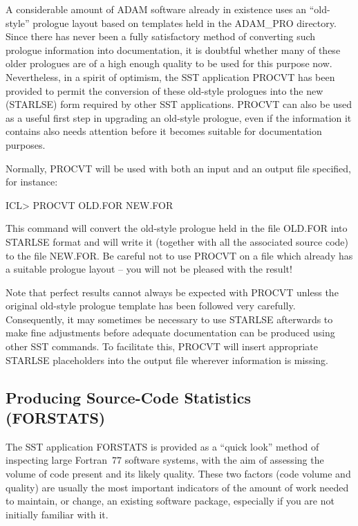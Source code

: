 \documentclass[twoside,11pt,nolof]{starlink}
\begin{document}
A considerable amount of ADAM software already in existence uses an
``old-style'' prologue layout based on templates held in the ADAM\_PRO
directory.
Since there has never been a fully satisfactory method of converting such
prologue information into documentation, it is doubtful whether many of
these older prologues are of a high enough quality to be used for this
purpose now.
Nevertheless, in a spirit of optimism, the SST application PROCVT has been
provided to permit the conversion of these old-style prologues into the new
(STARLSE) form required by other SST applications.
PROCVT can also be used as a useful first step in upgrading an old-style
prologue, even if the information it contains also needs attention before it
becomes suitable for documentation purposes.

Normally, PROCVT will be used with both an input and an output file
specified, for instance:

\begin{terminalv}
ICL> PROCVT OLD.FOR NEW.FOR
\end{terminalv}

This command will convert the old-style prologue held in the file OLD.FOR
into STARLSE format and will write it (together with all the associated
source code) to the file NEW.FOR.
Be careful not to use PROCVT on a file which already has a suitable prologue
layout -- you will not be pleased with the result!

Note that perfect results cannot always be expected with PROCVT unless the
original old-style prologue template has been followed very carefully.
Consequently, it may sometimes be necessary to use STARLSE afterwards to
make fine adjustments before adequate documentation can be produced using
other SST commands.
To facilitate this, PROCVT will insert appropriate STARLSE placeholders into
the output file wherever information is missing.


\subsection{Producing Source-Code Statistics (FORSTATS)}

The SST application FORSTATS is provided as a ``quick look'' method of
inspecting large Fortran~77 software systems, with the aim of assessing the
volume of code present and its likely quality.
These two factors (code volume and quality) are usually the most important
indicators of the amount of work needed to maintain, or change, an existing
software package, especially if you are not initially familiar with it.
\end{document}

